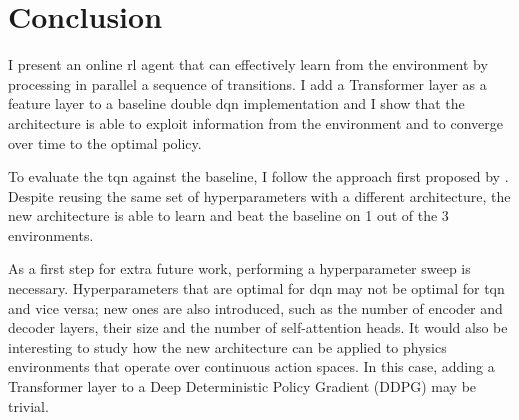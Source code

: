 \section{Conclusion}

I present an online \acrshort{rl} agent that can effectively learn from the environment by processing in parallel a sequence of transitions. I add a Transformer layer as a feature layer to a baseline double \acrshort{dqn} implementation and I show that the architecture is able to exploit information from the environment and to converge over time to the optimal policy.

To evaluate the \acrshort{tqn} against the baseline, I follow the approach first proposed by \cite{rliable}. Despite reusing the same set of hyperparameters with a different architecture, the new architecture is able to learn and beat the baseline on 1 out of the 3 environments.

As a first step for extra future work, performing a hyperparameter sweep is necessary. Hyperparameters that are optimal for \acrshort{dqn} may not be optimal for \acrshort{tqn} and vice versa; new ones are also introduced, such as the number of encoder and decoder layers, their size and the number of self-attention heads. It would also be interesting to study how the new architecture can be applied to physics environments that operate over continuous action spaces. In this case, adding a Transformer layer to a Deep Deterministic Policy Gradient (DDPG) may be trivial.
